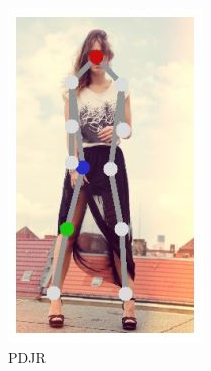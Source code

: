 \begin{figure}[t]
\centering
\begin{subfigure}[b]{.16\textwidth}
	\centering
	\includegraphics[width=\textwidth]{./images/regpose_topology.png}
	\caption{PDJR \cite{PDJR}}
\end{subfigure}
\begin{subfigure}[b]{.3\textwidth}
	\centering

\end{subfigure}
\end{figure}
